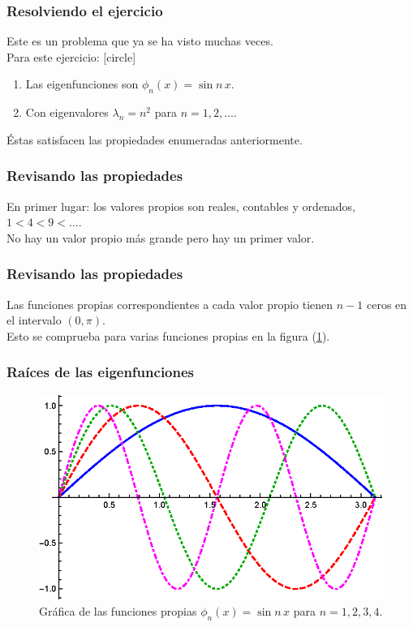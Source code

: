 \documentclass[12pt]{beamer}
\begin{document}
\begin{frame}
\frametitle{Resolviendo el ejercicio}
Este es un problema que ya se ha visto muchas veces.
\\
\bigskip
\pause
Para este ejercicio:
[circle]
\begin{enumerate}[<+->]
\item Las eigenfunciones son $\phi_{n} (x) = \sin n\, x$.
\item Con eigenvalores $\lambda_{n} = n^{2}$ para $n = 1, 2, \ldots$.
\end{enumerate}
\pause
Éstas satisfacen las propiedades enumeradas anteriormente.
\end{frame}
\begin{frame}
\frametitle{Revisando las propiedades}
En primer lugar: \pause los valores propios son reales, contables y ordenados, $1 < 4 < 9 < \ldots$.
\\
\bigskip
\pause
No hay un valor propio más grande pero hay un primer valor.
\end{frame}
\begin{frame}
\frametitle{Revisando las propiedades}
Las funciones propias correspondientes a cada valor propio tienen $n -1$ ceros en el intervalo $(0, \pi)$.
\\
\bigskip
\pause
Esto se comprueba para varias funciones propias en la figura (\ref{fig:figura_04_01}).
\end{frame}
\begin{frame}
\frametitle{Raíces de las eigenfunciones}
\begin{figure}[H]
\centering
\includegraphics[scale=1]{Imagenes/Eigenfunciones_Sin_nx.eps}
\caption{Gráfica de las funciones propias $\phi_{n} (x) = \sin n \,x$ para $n = 1, 2, 3, 4$.}
\label{fig:figura_04_01}
\end{figure}
\end{frame}
\end{document}
